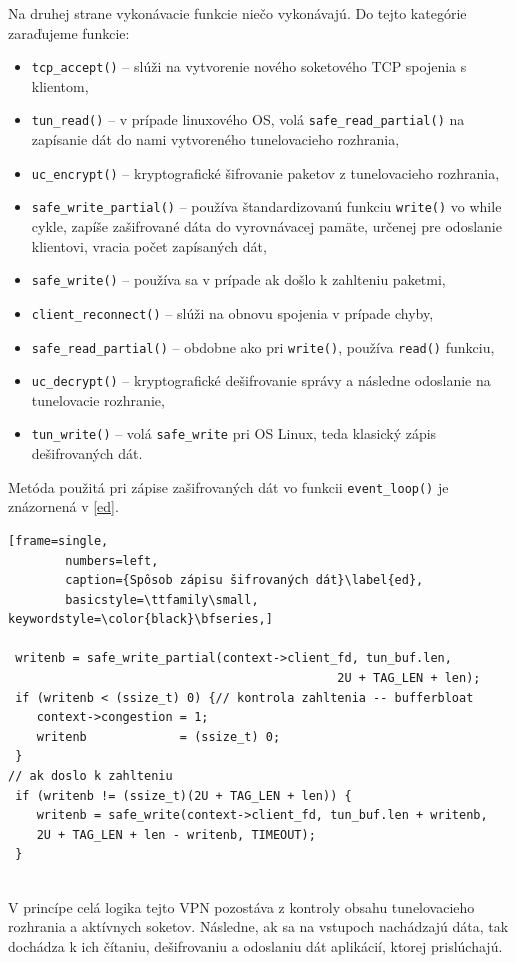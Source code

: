 Na druhej strane vykonávacie funkcie niečo vykonávajú. Do tejto kategórie zaraďujeme funkcie:
 \begin{itemize}
 	\item\lstinline|tcp_accept()| -- slúži na vytvorenie nového soketového TCP spojenia s klientom, 
 	\item\lstinline|tun_read()| -- v prípade linuxového OS, volá \lstinline|safe_read_partial()| na zapísanie dát do nami vytvoreného tunelovacieho rozhrania,
 	\item\lstinline|uc_encrypt()| -- kryptografické šifrovanie paketov z tunelovacieho rozhrania,
 	\item\lstinline|safe_write_partial()| -- používa štandardizovanú funkciu \lstinline|write()| vo while cykle, zapíše zašifrované dáta do vyrovnávacej pamäte, určenej pre odoslanie klientovi, vracia počet zapísaných dát,
 	\item\lstinline|safe_write()| -- používa sa v prípade ak došlo k zahlteniu paketmi,
 	\item\lstinline|client_reconnect()| -- slúži na obnovu spojenia v prípade chyby,
 	\item\lstinline|safe_read_partial()| -- obdobne ako pri \lstinline|write()|, používa \lstinline|read()| funkciu,
 	\item\lstinline|uc_decrypt()| -- kryptografické dešifrovanie správy a následne odoslanie na tunelovacie rozhranie,
 	\item\lstinline|tun_write()| -- volá \lstinline|safe_write| pri OS Linux, teda klasický zápis dešifrovaných dát.
 \end{itemize}
Metóda použitá pri zápise zašifrovaných dát vo funkcii \lstinline|event_loop()| je znázornená v \ref{ed}.

 \begin{minipage}{\linewidth} 	
 	\begin{lstlisting}[frame=single,
 		numbers=left,
 		caption={Spôsob zápisu šifrovaných dát}\label{ed},
 		basicstyle=\ttfamily\small, keywordstyle=\color{black}\bfseries,]
 		
 writenb = safe_write_partial(context->client_fd, tun_buf.len,
 			    	 		         		  2U + TAG_LEN + len); 
 if (writenb < (ssize_t) 0) {// kontrola zahltenia -- bufferbloat
 	context->congestion = 1; 
 	writenb             = (ssize_t) 0;
 }
// ak doslo k zahlteniu
 if (writenb != (ssize_t)(2U + TAG_LEN + len)) {
 	writenb = safe_write(context->client_fd, tun_buf.len + writenb,
 	2U + TAG_LEN + len - writenb, TIMEOUT); 
 }
   	\end{lstlisting}
\end{minipage}\\ 
V princípe celá logika tejto VPN pozostáva z kontroly obsahu tunelovacieho rozhrania a aktívnych soketov. Následne, ak sa na vstupoch nachádzajú dáta, tak dochádza k ich čítaniu, dešifrovaniu a odoslaniu dát aplikácií, ktorej prislúchajú.


